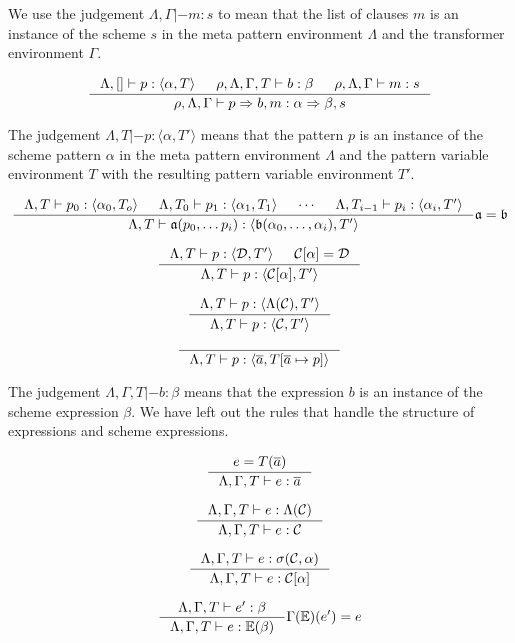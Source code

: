 \documentclass[a4, oneside]{article}
\begin{document}
We use the judgement $\Lambda, \Gamma |- m : s$ to mean that the list of clauses
$m$ is an instance of the scheme $s$ in the meta pattern environment $\Lambda$
and the transformer environment $\Gamma$.

\[
\inference{\Lambda, [] |- p : \langle \alpha, T \rangle & \rho, \Lambda, \Gamma,
  T |- b : \beta & \rho, \Lambda, \Gamma |- m : s} {\rho, \Lambda, \Gamma |- p
  => b, m : \alpha => \beta, s}
\]

The judgement $\Lambda, T |- p : \langle \alpha, T' \rangle$ means that the
pattern $p$ is an instance of the scheme pattern $\alpha$ in the meta pattern
environment $\Lambda$ and the pattern variable environment $T$ with the
resulting pattern variable environment $T'$.

\[
\inference{\Lambda, T |- p_0 : \langle \alpha_0, T_o \rangle & \Lambda, T_0 |-
  p_1 : \langle \alpha_1, T_1 \rangle & \cdots & \Lambda, T_{i-1} |- p_i :
  \langle \alpha_i, T' \rangle } {\Lambda, T |- \mathfrak{a}(p_0, \ldots p_i) :
  \langle \mathfrak{b}(\alpha_0, \ldots, \alpha_i), T' \rangle} {\mathfrak{a} =
  \mathfrak{b}}
\]

\[
\inference { \Lambda, T |- p : \langle \mathcal{D}, T' \rangle&
  \mathcal{C}[\alpha] = \mathcal{D} } { \Lambda, T |- p : \langle
  \mathcal{C}[\alpha], T' \rangle }
\]

\[
\inference { \Lambda, T |- p : \langle \Lambda(\mathcal{C}), T' \rangle } {
  \Lambda, T |- p : \langle \mathcal{C}, T' \rangle }
\]

\[
\inference{} {\Lambda, T |- p : \langle \overline{a}, T[\overline{a} \mapsto p]
  \rangle}
\]

The judgement $\Lambda, \Gamma, T |- b : \beta$ means that the expression $b$ is
an instance of the scheme expression $\beta$. We have left out the rules that
handle the structure of expressions and scheme expressions.

\[
\inference{e = T(\overline{a})} {\Lambda, \Gamma, T |- e : \overline{a}}
\]

\[
\inference{\Lambda, \Gamma, T |- e : \Lambda(\mathcal{C})} {\Lambda, \Gamma, T
  |- e : \mathcal{C}}
\]

\[
\inference {\Lambda, \Gamma, T |- e : \sigma(\mathcal{C}, \alpha)} {\Lambda,
  \Gamma, T |- e : \mathcal{C}[\alpha]}
\]

\[
\inference{\Lambda, \Gamma, T |- e' : \beta} {\Lambda, \Gamma, T |- e :
  \mathbb{E}(\beta)}{\Gamma(\mathbb{E})(e') = e}
\]
\end{document}
